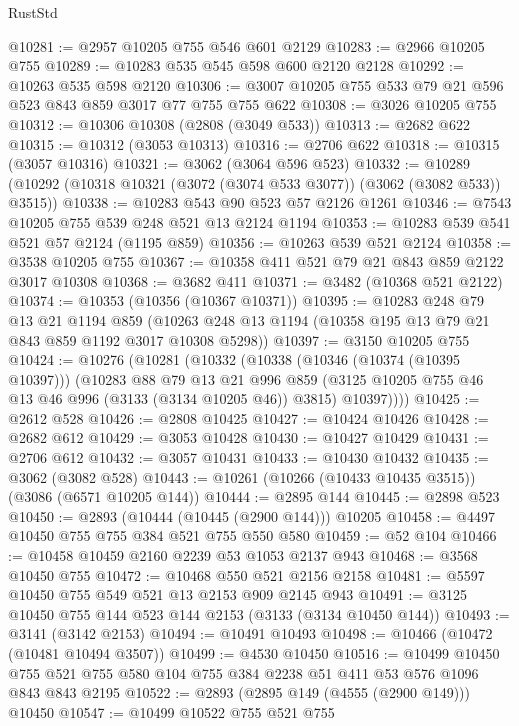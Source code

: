\begin{lexlean}{RustStd}
\begin{coremodule}
@10281 := @2957 @10205 @755 @546 @601 @2129
@10283 := @2966 @10205 @755
@10289 := @10283 @535 @545 @598 @600 @2120 @2128
@10292 := @10263 @535 @598 @2120
@10306 := @3007 @10205 @755 @533 @79 @21 @596 @523 @843 @859 @3017 @77 @755 @755 @622
@10308 := @3026 @10205 @755
@10312 := @10306 @10308 (@2808 (@3049 @533))
@10313 := @2682 @622
@10315 := @10312 (@3053 @10313)
@10316 := @2706 @622
@10318 := @10315 (@3057 @10316)
@10321 := @3062 (@3064 @596 @523)
@10332 := @10289 (@10292 (@10318 @10321 (@3072 (@3074 @533 @3077)) (@3062 (@3082 @533)) @3515))
@10338 := @10283 @543 @90 @523 @57 @2126 @1261
@10346 := @7543 @10205 @755 @539 @248 @521 @13 @2124 @1194
@10353 := @10283 @539 @541 @521 @57 @2124 (@1195 @859)
@10356 := @10263 @539 @521 @2124
@10358 := @3538 @10205 @755
@10367 := @10358 @411 @521 @79 @21 @843 @859 @2122 @3017 @10308
@10368 := @3682 @411
@10371 := @3482 (@10368 @521 @2122)
@10374 := @10353 (@10356 (@10367 @10371))
@10395 := @10283
    @248
    @79
    @13
    @21
    @1194
    @859
    (@10263 @248 @13 @1194 (@10358 @195 @13 @79 @21 @843 @859 @1192 @3017 @10308 @5298))
@10397 := @3150 @10205 @755
@10424 := @10276
    (@10281
      (@10332
        (@10338
          (@10346 (@10374 (@10395 @10397)))
          (@10283
            @88
            @79
            @13
            @21
            @996
            @859
            (@3125 @10205 @755 @46 @13 @46 @996 (@3133 (@3134 @10205 @46)) @3815)
            @10397))))
@10425 := @2612 @528
@10426 := @2808 @10425
@10427 := @10424 @10426
@10428 := @2682 @612
@10429 := @3053 @10428
@10430 := @10427 @10429
@10431 := @2706 @612
@10432 := @3057 @10431
@10433 := @10430 @10432
@10435 := @3062 (@3082 @528)
@10443 := @10261 (@10266 (@10433 @10435 @3515)) (@3086 (@6571 @10205 @144))
@10444 := @2895 @144
@10445 := @2898 @523
@10450 := @2893 (@10444 (@10445 (@2900 @144))) @10205
@10458 := @4497 @10450 @755 @755 @384 @521 @755 @550 @580
@10459 := @52 @104
@10466 := @10458 @10459 @2160 @2239 @53 @1053 @2137 @943
@10468 := @3568 @10450 @755
@10472 := @10468 @550 @521 @2156 @2158
@10481 := @5597 @10450 @755 @549 @521 @13 @2153 @909 @2145 @943
@10491 := @3125 @10450 @755 @144 @523 @144 @2153 (@3133 (@3134 @10450 @144))
@10493 := @3141 (@3142 @2153)
@10494 := @10491 @10493
@10498 := @10466 (@10472 (@10481 @10494 @3507))
@10499 := @4530 @10450
@10516 := @10499
    @10450
    @755
    @521
    @755
    @580
    @104
    @755
    @384
    @2238
    @51
    @411
    @53
    @576
    @1096
    @843
    @843
    @2195
@10522 := @2893 (@2895 @149 (@4555 (@2900 @149))) @10450
@10547 := @10499
    @10522
    @755
    @521
    @755

\end{coremodule}
\end{lexlean}
